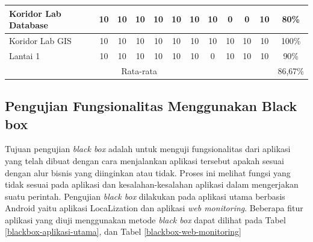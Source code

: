 \begin{enumerate}
\begin{table}[H]
\begin{tabular}{|lccccccccccc|}
			      \multicolumn{1}{|l|}{Koridor Lab Database}                            & \multicolumn{1}{c|}{10}                                 & \multicolumn{1}{c|}{10} & \multicolumn{1}{c|}{10} & \multicolumn{1}{c|}{10} & \multicolumn{1}{c|}{10} & \multicolumn{1}{c|}{10} & \multicolumn{1}{c|}{10} & \multicolumn{1}{c|}{0}  & \multicolumn{1}{c|}{0}  & \multicolumn{1}{c|}{10} & 80\%  \\ \hline
			      \multicolumn{1}{|l|}{Koridor Lab GIS}                                 & \multicolumn{1}{c|}{10}                                 & \multicolumn{1}{c|}{10} & \multicolumn{1}{c|}{10} & \multicolumn{1}{c|}{10} & \multicolumn{1}{c|}{10} & \multicolumn{1}{c|}{10} & \multicolumn{1}{c|}{10} & \multicolumn{1}{c|}{10} & \multicolumn{1}{c|}{10} & \multicolumn{1}{c|}{10} & 100\% \\ \hline
			      \multicolumn{1}{|l|}{Lantai 1}                                        & \multicolumn{1}{c|}{10}                                 & \multicolumn{1}{c|}{10} & \multicolumn{1}{c|}{10} & \multicolumn{1}{c|}{10} & \multicolumn{1}{c|}{10} & \multicolumn{1}{c|}{10} & \multicolumn{1}{c|}{0}  & \multicolumn{1}{c|}{10} & \multicolumn{1}{c|}{10} & \multicolumn{1}{c|}{10} & 90\%  \\ \hline
			      \multicolumn{11}{|c|}{Rata-rata}                                      & 86,67\%                                                                                                                                                                                                                                                                                                   \\ \hline
		      \end{tabular}
	      \end{table}

\end{enumerate}

\subsection{Pengujian Fungsionalitas Menggunakan Black box}
\par Tujuan pengujian \textit{black box} adalah untuk menguji fungsionalitas dari aplikasi yang telah dibuat dengan cara menjalankan aplikasi tersebut apakah sesuai dengan alur bisnis yang diinginkan atau tidak. Proses ini melihat fungsi yang tidak sesuai pada aplikasi dan kesalahan-kesalahan aplikasi dalam mengerjakan suatu perintah. Pengujian \textit{black box} dilakukan pada aplikasi utama berbasis Android yaitu aplikasi LocaLization dan aplikasi \textit{web monitoring}. Beberapa fitur aplikasi yang diuji menggunakan metode \textit{black box} dapat dilihat pada Tabel \ref{blackbox-aplikasi-utama}, dan Tabel \ref{blackbox-web-monitoring}

